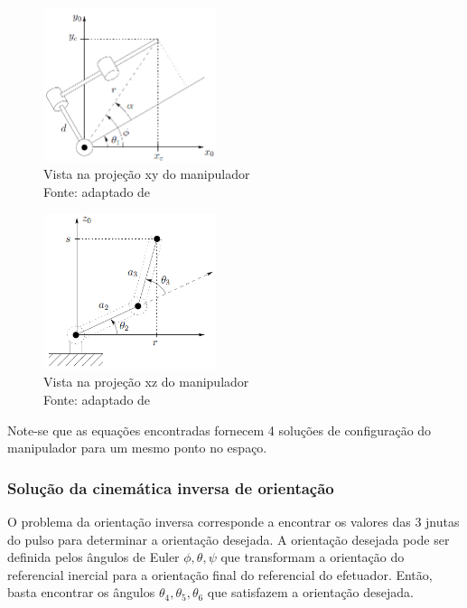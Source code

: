\begin{figure}[h]
	\centering 
 	\includegraphics[width=0.45\textwidth]{figs/geom_pos_sup}
 	\caption[Vista na projeção xy do manipulador]{Vista na projeção xy do manipulador
 	\\ Fonte: adaptado de~\cite{spong2006robot}}
 	\label{fig::geom_pos_sup}
\end{figure}

\begin{figure}[h]
	\centering 
 	\includegraphics[width=0.45\textwidth]{figs/geom_pos_lat}
 	\caption[Vista na projeção xz do manipulador]{Vista na projeção xz do
 	manipulador \\ Fonte: adaptado de~\cite{spong2006robot}}
 	\label{fig::geom_pos_lat}
\end{figure}

Note-se que as equações encontradas fornecem 4 soluções de configuração do
manipulador para um mesmo ponto no espaço.

\subsubsection{Solução da cinemática inversa de orientação}

O problema da orientação inversa corresponde a encontrar os valores das 3 jnutas
do pulso para determinar a orientação desejada. A orientação desejada pode ser
definida pelos ângulos de Euler $\phi, \theta, \psi$ que transformam a
orientação do referencial inercial para a orientação final do referencial do
efetuador.
Então, basta encontrar os ângulos $\theta_4, \theta_5, \theta_6$ que satisfazem
a orientação desejada.

